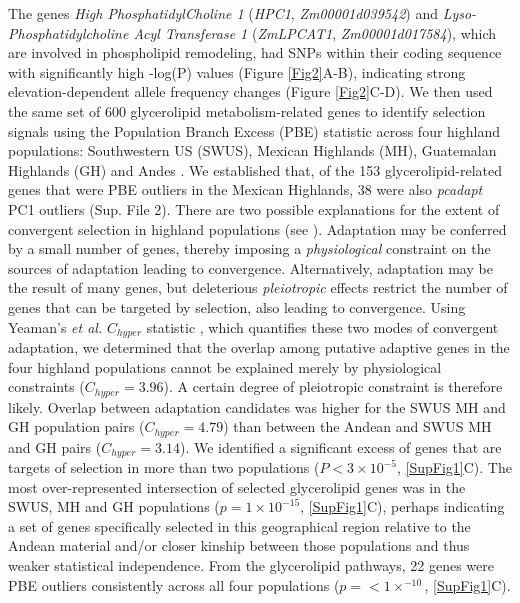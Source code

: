 \documentclass[9pt,twocolumn,twoside,lineno]{biorxiv}
\begin{document}
The genes  \textit{High PhosphatidylCholine 1} (\textit{HPC1}, \textit{Zm00001d039542}) and \textit{Lyso-Phosphatidylcholine Acyl Transferase 1} (\textit{ZmLPCAT1}, \textit{Zm00001d017584}), which are involved in phospholipid remodeling, had SNPs within their coding sequence with significantly high -log(P) values (Figure \ref{Fig2}A-B), indicating strong elevation-dependent allele frequency changes (Figure \ref{Fig2}C-D). 
We then used the same set of 600 glycerolipid metabolism-related genes to identify selection signals using the Population Branch Excess (PBE) \cite{Pool2017-oa} statistic across four highland populations: Southwestern US (SWUS), Mexican Highlands (MH), Guatemalan Highlands (GH) and Andes \cite{Wang2020-mp}.
We established that, of the 153 glycerolipid-related genes that were PBE outliers in the Mexican Highlands, 38 were also \textit{pcadapt} PC1 outliers (Sup. File 2).
There are two possible explanations for the extent of convergent selection in highland populations (see \cite{Wang2020-mp, yeaman2018}). 
Adaptation may be conferred by a small number of genes, thereby imposing a \textit{physiological} constraint on the sources of adaptation leading to convergence. 
Alternatively, adaptation may be the result of many genes, but deleterious \textit{pleiotropic} effects restrict the number of genes that can be targeted by selection, also leading to convergence.  
Using Yeaman's \textit{et al.} $C_{hyper}$ statistic \cite{yeaman2018}, which quantifies these two modes of convergent adaptation, we determined that the overlap among putative adaptive genes in the four highland populations cannot be explained merely by physiological constraints ($C_{hyper} = 3.96$). A certain degree of pleiotropic constraint is therefore likely.
Overlap between adaptation candidates was higher for the SWUS MH and GH population pairs ($C_{hyper} = 4.79$) than between the Andean and SWUS MH and GH pairs ($C_{hyper} = 3.14$).
We identified a significant excess of genes that are targets of selection in more than two populations ($P< 3 \times 10^{-5}$, \ref{SupFig1}C).
The most over-represented intersection of selected glycerolipid genes was in the SWUS, MH and GH populations ($p = 1  \times 10 ^{-15} $, \ref{SupFig1}C), perhaps indicating a set of genes specifically selected in this geographical region relative to the Andean material and/or closer kinship between those populations and thus weaker statistical independence.
From the glycerolipid pathways, 22 genes were PBE outliers consistently across all four populations ($p =<1  \times  ^{-10}$, \ref{SupFig1}C). 
\end{document}
